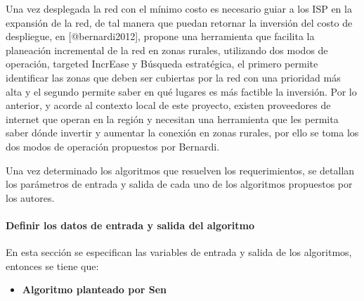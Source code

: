 \documentclass[]{article}
\providecommand{\tightlist}{%
  \setlength{\itemsep}{0pt}\setlength{\parskip}{0pt}}
\let\oldparagraph\paragraph
\renewcommand{\paragraph}[1]{\oldparagraph{#1}\mbox{}}
\begin{document}
Una vez desplegada la red con el mínimo costo es necesario guiar a los
ISP en la expansión de la red, de tal manera que puedan retornar la
inversión del costo de despliegue, en {[}@bernardi2012{]}, propone una
herramienta que facilita la planeación incremental de la red en zonas
rurales, utilizando dos modos de operación, targeted IncrEase y Búsqueda
estratégica, el primero permite identificar las zonas que deben ser
cubiertas por la red con una prioridad más alta y el segundo permite
saber en qué lugares es más factible la inversión. Por lo anterior, y
acorde al contexto local de este proyecto, existen proveedores de
internet que operan en la región y necesitan una herramienta que les
permita saber dónde invertir y aumentar la conexión en zonas rurales,
por ello se toma los dos modos de operación propuestos por Bernardi.

Una vez determinado los algoritmos que resuelven los requerimientos, se
detallan los parámetros de entrada y salida de cada uno de los
algoritmos propuestos por los autores.

\paragraph{Definir los datos de entrada y salida del
algoritmo}\label{definir-los-datos-de-entrada-y-salida-del-algoritmo}

En esta sección se especifican las variables de entrada y salida de los
algoritmos, entonces se tiene que:

\begin{itemize}
\tightlist
\item
  \textbf{Algoritmo planteado por Sen}
\end{itemize}
\end{document}

